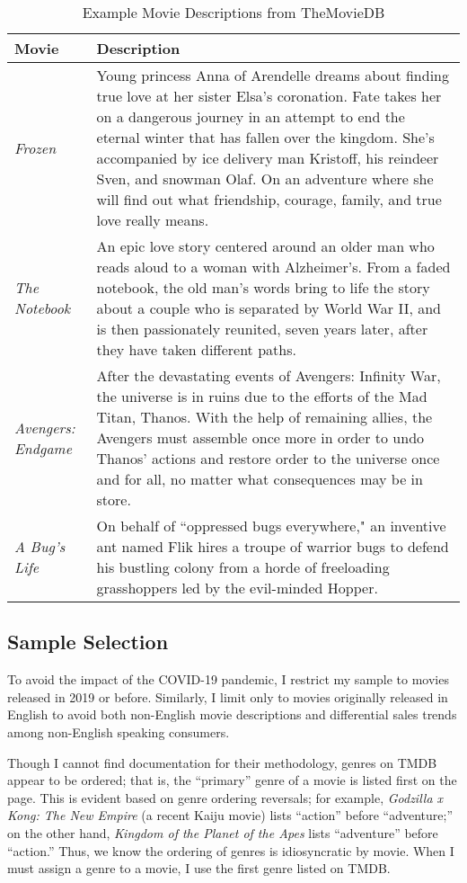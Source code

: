 \documentclass{article}
\begin{document}
\begin{table}
    \begin{tabular}{lp{11cm}}
        \toprule 
        \textbf{Movie} & \textbf{Description} \\
        \midrule
        \emph{Frozen} & Young princess Anna of Arendelle dreams about finding true love at her sister Elsa’s coronation. Fate takes her on a dangerous journey in an attempt to end the eternal winter that has fallen over the kingdom. She's accompanied by ice delivery man Kristoff, his reindeer Sven, and snowman Olaf. On an adventure where she will find out what friendship, courage, family, and true love really means. \\
        \emph{The Notebook} & An epic love story centered around an older man who reads aloud to a woman with Alzheimer's. From a faded notebook, the old man's words bring to life the story about a couple who is separated by World War II, and is then passionately reunited, seven years later, after they have taken different paths. \\
        \emph{Avengers: Endgame} & After the devastating events of Avengers: Infinity War, the universe is in ruins due to the efforts of the Mad Titan, Thanos. With the help of remaining allies, the Avengers must assemble once more in order to undo Thanos' actions and restore order to the universe once and for all, no matter what consequences may be in store. \\
        \emph{A Bug's Life} & On behalf of ``oppressed bugs everywhere," an inventive ant named Flik hires a troupe of warrior bugs to defend his bustling colony from a horde of freeloading grasshoppers led by the evil-minded Hopper. \\
        \bottomrule
    \end{tabular} 
    \caption{Example Movie Descriptions from TheMovieDB}
    \label{tab:tmdb_desc}
\end{table}

\subsection{Sample Selection}

To avoid the impact of the COVID-19 pandemic, I restrict my sample to movies released in 2019 or before. Similarly, I limit only to movies originally released in English to avoid both non-English movie descriptions and differential sales trends among non-English speaking consumers.

Though I cannot find documentation for their methodology, genres on TMDB appear to be ordered; that is, the ``primary'' genre of a movie is listed first on the page. This is evident based on genre ordering reversals; for example, \emph{Godzilla x Kong: The New Empire} (a recent Kaiju movie) lists ``action'' before ``adventure;'' on the other hand, \emph{Kingdom of the Planet of the Apes} lists ``adventure'' before ``action.'' Thus, we know the ordering of genres is idiosyncratic by movie. When I must assign a genre to a movie, I use the first genre listed on TMDB.  
\end{document}
